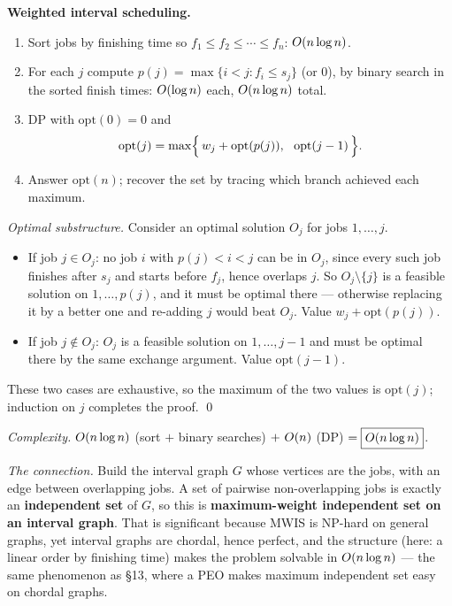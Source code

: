 \textbf{Weighted interval scheduling.}
\begin{enumerate}
  \item Sort jobs by finishing time so $f_1\le f_2\le\cdots\le f_n$: $O(n\log n)$.
  \item For each $j$ compute $p(j)=\max\{i<j: f_i\le s_j\}$ (or $0$), by binary search in the
        sorted finish times: $O(\log n)$ each, $O(n\log n)$ total.
  \item DP with $\mathrm{opt}(0)=0$ and
        \[
          \mathrm{opt}(j)=\max\Bigl\{\,w_j+\mathrm{opt}(p(j)),\ \ \mathrm{opt}(j-1)\,\Bigr\}.
        \]
  \item Answer $\mathrm{opt}(n)$; recover the set by tracing which branch achieved each maximum.
\end{enumerate}
\emph{Optimal substructure.} Consider an optimal solution $O_j$ for jobs $1,\dots,j$.
\begin{itemize}
  \item If job $j\in O_j$: no job $i$ with $p(j)<i<j$ can be in $O_j$, since every such job
        finishes after $s_j$ and starts before $f_j$, hence overlaps $j$. So
        $O_j\setminus\{j\}$ is a feasible solution on $1,\dots,p(j)$, and it must be optimal
        there --- otherwise replacing it by a better one and re-adding $j$ would beat $O_j$.
        Value $w_j+\mathrm{opt}(p(j))$.
  \item If job $j\notin O_j$: $O_j$ is a feasible solution on $1,\dots,j-1$ and must be optimal
        there by the same exchange argument. Value $\mathrm{opt}(j-1)$.
\end{itemize}
These two cases are exhaustive, so the maximum of the two values is $\mathrm{opt}(j)$; induction
on $j$ completes the proof. \qed

\emph{Complexity.} $O(n\log n)$ (sort $+$ binary searches) $+\ O(n)$ (DP) $=\boxed{O(n\log n)}$.

\emph{The connection.} Build the interval graph $G$ whose vertices are the jobs, with an edge
between overlapping jobs. A set of pairwise non-overlapping jobs is exactly an
\textbf{independent set} of $G$, so this is \textbf{maximum-weight independent set on an interval
graph}. That is significant because MWIS is NP-hard on general graphs, yet interval graphs are
chordal, hence perfect, and the structure (here: a linear order by finishing time) makes the
problem solvable in $O(n\log n)$ --- the same phenomenon as \S13, where a PEO makes maximum
independent set easy on chordal graphs.

